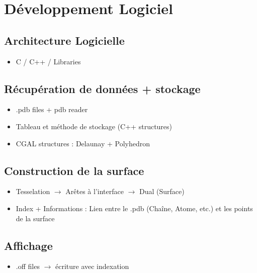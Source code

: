 \chapter{Développement Logiciel}

\section{Architecture Logicielle}
\begin{itemize}
  \item C / C++ / Libraries
\end{itemize}

\section{Récupération de données + stockage}
\begin{itemize}
  \item .pdb files + pdb reader
  \item Tableau et méthode de stockage (C++ structures)
  \item CGAL structures : Delaunay + Polyhedron
\end{itemize}

\section{Construction de la surface}
\begin{itemize}
  \item Tesselation $\to$ Arêtes à l'interface $\to$ Dual (Surface)
  \item Index + Informations : Lien entre le .pdb (Chaîne, Atome, etc.) et les points de la surface
\end{itemize}

\section{Affichage}
\begin{itemize}
  \item .off files $\to$ écriture avec indexation
\end{itemize}
